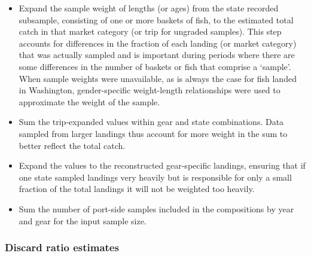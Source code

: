 \documentclass[11pt,
  english,
  a4paper,
]{article}
\begin{document}
\begin{itemize}
\item

  Expand the sample weight of lengths (or ages) from the state recorded subsample, consisting of one or more baskets of fish, to the estimated total catch in that market category (or trip for ungraded samples). This step accounts for differences in the fraction of each landing (or market category) that was actually sampled and is important during periods where there are some differences in the number of baskets or fish that comprise a `sample'. When sample weights were unavailable, as is always the case for fish landed in Washington, gender-specific weight-length relationships were used to approximate the weight of the sample.

  \tagmcend\tagstructend\tagstructend
\item

  Sum the trip-expanded values within gear and state combinations. Data sampled from larger landings thus account for more weight in the sum to better reflect the total catch.

  \tagmcend\tagstructend\tagstructend
\item

  Expand the values to the reconstructed gear-specific landings, ensuring that if one state sampled landings very heavily but is responsible for only a small fraction of the total landings it will not be weighted too heavily.

  \tagmcend\tagstructend\tagstructend
\item

  Sum the number of port-side samples included in the compositions by year and gear for the input sample size.

  \tagmcend\tagstructend\tagstructend
\end{itemize}

\tagstructend


\hypertarget{discard-ratio-estimates}{%
\subsubsection{Discard ratio estimates}\label{discard-ratio-estimates}}
\end{document}
